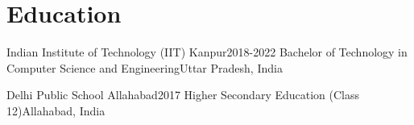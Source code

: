 \section{Education}
    \resumeSubHeadingListStart

    \resumeSubheading
    {Indian Institute of Technology (IIT) Kanpur}{2018-2022}
    {Bachelor of Technology in Computer Science and Engineering}{Uttar Pradesh, India}
    
    \resumeSubheading
    {Delhi Public School Allahabad}{2017}
    {Higher Secondary Education (Class 12)}{Allahabad, India}
    
    \resumeSubHeadingListEnd
